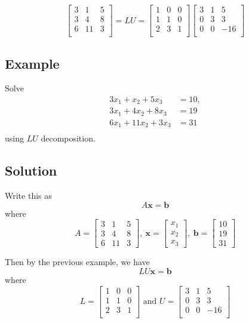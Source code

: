 \documentclass[11pt]{article}
\renewcommand{\vec}[1]{\mathbf{#1}}
\begin{document}
\begin{enumerate}[ (i) ]
\[ \begin{bmatrix}
3 & 1 & 5 \\
3 & 4 & 8 \\
6 & 11 & 3 \\
\end{bmatrix} 
= LU 
= \begin{bmatrix}
1 & 0 & 0 \\
1 & 1 & 0 \\
2 & 3 & 1 \\
\end{bmatrix}
\begin{bmatrix}
3 & 1 & 5 \\
0 & 3 & 3 \\
0 & 0 & -16 \\
\end{bmatrix}
\]
\end{enumerate}

\subsection{Example}
Solve
\begin{align*}
3x_1 + x_2 + 5x_3 &= 10, \\
3x_1 + 4x_2 + 8x_3 &= 19 \\
6x_1 + 11x_2 + 3x_3 &= 31 \\
\end{align*}
using $LU$ decomposition.

\subsection{Solution}
Write this as
\[ A \vec{x} = \vec{b} \]
where 
\[ A = \begin{bmatrix}
3 & 1 & 5 \\
3 & 4 & 8 \\
6 & 11 & 3 
\end{bmatrix},\ 
\vec{x} = \begin{bmatrix}
x_1 \\
x_2 \\
x_3
\end{bmatrix},\ 
\vec{b} = \begin{bmatrix}
10 \\
19 \\
31
\end{bmatrix} \]

Then by the previous example, we have
\[ LU \vec{x} = \vec{b} \]
where
\[
L = \begin{bmatrix}
1 & 0 & 0 \\
1 & 1 & 0 \\
2 & 3 & 1 \\
\end{bmatrix} \text{ and }
U = \begin{bmatrix}
3 & 1 & 5 \\
0 & 3 & 3 \\
0 & 0 & -16 \\
\end{bmatrix}
\]
\end{document}
